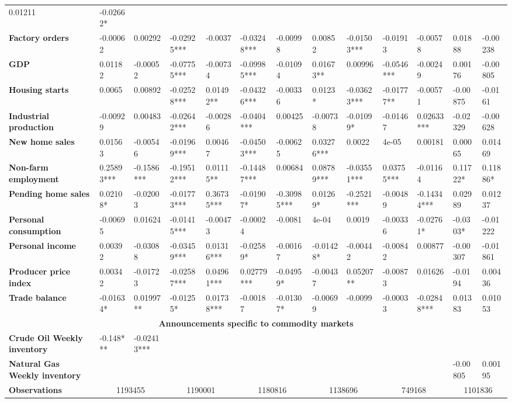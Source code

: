 \begin{sidewaystable}
{\begin{tabular}{@{}lllllllllllll@{}}
0.01211 & -0.02662* \\ \textbf{Factory orders}& -0.00062 & 0.00292 & -0.02925*** & -0.0037 & -0.03248*** & -0.00998 & 0.00852 & -0.01503*** & -0.01913 & -0.00578 & 0.01888 & -0.00238 \\ \textbf{GDP}& 0.01182 & -0.00052 & -0.07755*** & -0.00734 & -0.09985*** & -0.01094 & 0.01673** & 0.00996 & -0.0546*** & -0.00249 & 0.00176 & -0.00805 \\ \textbf{Housing starts}& 0.0065 & 0.00892 & -0.02528*** & 0.01492** & -0.04326*** & -0.00336 & 0.0123* & -0.03623*** & -0.01777** & -0.00571 & -0.00875 & -0.0161 \\ \textbf{Industrial production}& -0.00929 & 0.00483 & -0.02642*** & -0.00286 & -0.0404*** & 0.00425 & -0.00738 & -0.01099* & -0.01467 & 0.02633*** & -0.02329 & -0.00628 \\ \textbf{New home sales}& 0.01563 & -0.00546 & -0.01969*** & 0.00467 & -0.04503*** & -0.00625 & 0.03276*** & 0.0022 & 4e-05 & 0.00181 & 0.00065 & 0.01469 \\ \textbf{Non-farm employment}& 0.25893*** & -0.1586*** & -0.19512*** & 0.01115** & -0.14487*** & 0.00684 & 0.08789*** & -0.03551*** & 0.03755*** & -0.01164 & 0.11722* & 0.11886* \\ \textbf{Pending home sales}& 0.02108* & -0.02003 & -0.01773*** & 0.36735*** & -0.01907* & -0.30985*** & 0.01269* & -0.2521*** & -0.00489 & -0.14344*** & 0.02989 & 0.01237 \\ \textbf{Personal consumption}& -0.00695 & 0.01624 & -0.01415*** & -0.00473 & -0.00024 & -0.0081 & 4e-04 & 0.0019 & -0.00336 & -0.02761* & -0.0303* & -0.01222 \\ \textbf{Personal income}& 0.00392 & -0.03088 & -0.03459*** & 0.01316*** & -0.02589* & -0.00167 & -0.01428* & -0.00442 & -0.00842 & 0.00877 & -0.00307 & -0.01861 \\ \textbf{Producer price index}& 0.00342 & -0.01723 & -0.02587*** & 0.04961***& 0.02779*** & -0.04959* & -0.00437 & 0.05207** & -0.00873 & 0.01626 & -0.0194 & 0.00436 \\ \textbf{Trade balance}& -0.01634* & 0.01997** & -0.01255* & 0.01738***& -0.00187 & -0.01307* & -0.00699 & -0.0099 & -0.00033 & -0.02848*** & 0.01383 & 0.01053 \\  \midrule \multicolumn{13}{c}{\textbf{Announcements specific to commodity markets}} \\ \midrule \textbf{Crude Oil Weekly inventory}& -0.148*** & -0.02413*** &  &  &  &  &  &  &  &  &  &  \\ \textbf{Natural Gas Weekly inventory}&  &  &  &  &  &  &  &  &  &  & -0.00805 & 0.00195 \\  \midrule \textbf{Observations}             &\multicolumn{2}{c}{ 1193455 }                                                 & \multicolumn{2}{c}{ 1190001 }                                                 & \multicolumn{2}{c}{ 1180816 }                                                 & \multicolumn{2}{c}{ 1138696 }                                                 & \multicolumn{2}{c}{ 749168 }                                                   & \multicolumn{2}{c}{ 1101836 }                                
\end{tabular}}
\end{sidewaystable}
